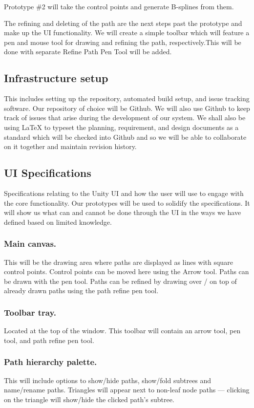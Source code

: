\documentclass[12pt]{article}
\begin{document}
Prototype \#2 will take the control points and generate B-splines from them.

The refining and deleting of the path are the next steps past the prototype and make up the UI functionality. We will create a simple toolbar which will feature a pen and mouse tool for drawing and refining the path, respectively.This will be done with separate Refine Path Pen Tool will be added.

\subsection{Infrastructure setup}
This includes setting up the repository, automated build setup, and issue tracking software. Our repository of choice will be Github. We will also use Github to keep track of issues that arise during the development of our system. We shall also be using LaTeX to typeset the planning, requirement, and design documents as a standard which will be checked into Github and so we will be able to collaborate on it together and maintain revision history.

\subsection{UI Specifications}
Specifications relating to the Unity UI and how the user will use to engage with the core functionality. Our prototypes will be used to solidify the specifications. It will show us what can and cannot be done through the UI in the ways we have defined based on limited knowledge.

\subsubsection{Main canvas.} This will be the drawing area where paths are displayed as lines with square control points. Control points can be moved here using the Arrow tool. Paths can be drawn with the pen tool. Paths can be refined by drawing over / on top of already drawn paths using the path refine pen tool.

\subsubsection{Toolbar tray.} Located at the top of the window. This toolbar will contain an arrow tool, pen tool, and path refine pen tool.

\subsubsection{Path hierarchy palette.} This will include options to show/hide paths, show/fold subtrees and name/rename paths. Triangles will appear next to non-leaf node paths --- clicking on the triangle will show/hide the clicked path’s subtree.
\end{document}
